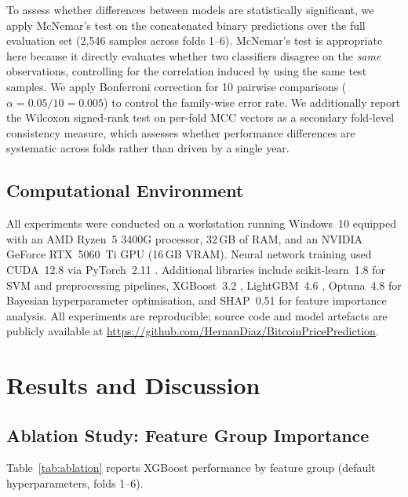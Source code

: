 \documentclass[final,3p,times,authoryear]{elsarticle}
\begin{document}
To assess whether differences between models are statistically
significant, we apply McNemar's test \citep{dietterich1998mcnemar} on the
concatenated binary predictions over the full evaluation set
(2{,}546 samples across folds 1--6).
McNemar's test is appropriate here because it directly evaluates
whether two classifiers disagree on the \emph{same} observations,
controlling for the correlation induced by using the same test samples.
We apply Bonferroni correction for 10 pairwise comparisons
($\alpha = 0.05 / 10 = 0.005$) to control the family-wise error rate.
We additionally report the Wilcoxon signed-rank test
\citep{wilcoxon1945individual} on per-fold MCC vectors as a secondary
fold-level consistency measure, which assesses whether performance
differences are systematic across folds rather than driven by a single
year.

\subsection{Computational Environment}
\label{sec:environment}

All experiments were conducted on a workstation running Windows~10 equipped
with an AMD Ryzen~5 3400G processor, 32\,GB of RAM, and an NVIDIA GeForce
RTX~5060~Ti GPU (16\,GB VRAM).
Neural network training used CUDA~12.8 via PyTorch~2.11
\citep{paszke2019pytorch}.
Additional libraries include scikit-learn~1.8 \citep{sklearn_api} for SVM
and preprocessing pipelines, XGBoost~3.2 \citep{chen2016xgboost},
LightGBM~4.6 \citep{ke2017lightgbm}, Optuna~4.8
\citep{akiba2019optuna} for Bayesian hyperparameter optimisation, and
SHAP~0.51 \citep{lundberg2017shap} for feature importance analysis.
All experiments are reproducible; source code and model artefacts are
publicly available at \url{https://github.com/HernanDiaz/BitcoinPricePrediction}.

\section{Results and Discussion}
\label{sec:results}

\subsection{Ablation Study: Feature Group Importance}
\label{sec:ablation}

Table~\ref{tab:ablation} reports XGBoost performance by feature group
(default hyperparameters, folds 1--6).
\end{document}
